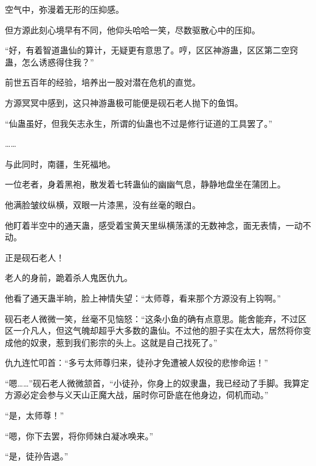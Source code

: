 \begin{this_body}
空气中，弥漫着无形的压抑感。

但方源此刻心境早有不同，他仰头哈哈一笑，尽数驱散心中的压抑。

“好，有着智道蛊仙的算计，无疑更有意思了。哼，区区神游蛊，区区第二空窍蛊，怎么诱惑得住我？”

前世五百年的经验，培养出一股对潜在危机的直觉。

方源冥冥中感到，这只神游蛊极可能便是砚石老人抛下的鱼饵。

“仙蛊虽好，但我矢志永生，所谓的仙蛊也不过是修行证道的工具罢了。”

……

与此同时，南疆，生死福地。

一位老者，身着黑袍，散发着七转蛊仙的幽幽气息，静静地盘坐在蒲团上。

他满脸皱纹纵横，双眼一片漆黑，没有丝毫的眼白。

他盯着半空中的通天蛊，感受着宝黄天里纵横荡漾的无数神念，面无表情，一动不动。

正是砚石老人！

老人的身前，跪着杀人鬼医仇九。

他看了通天蛊半晌，脸上神情失望：“太师尊，看来那个方源没有上钩啊。”

砚石老人微微一笑，丝毫不见恼怒：“这条小鱼的确有点意思。能舍能弃，不过区区一介凡人，但这气魄却超乎大多数的蛊仙。不过他的胆子实在太大，居然将你变成他的奴隶，惹到我们影宗的头上。这就是自己找死了。”

仇九连忙叩首：“多亏太师尊归来，徒孙才免遭被人奴役的悲惨命运！”

“嗯……”砚石老人微微颔首，“小徒孙，你身上的奴隶蛊，我已经动了手脚。我算定方源必定会参与义天山正魔大战，届时你可卧底在他身边，伺机而动。”

“是，太师尊！”

“嗯，你下去罢，将你师妹白凝冰唤来。”

“是，徒孙告退。”

\end{this_body}

